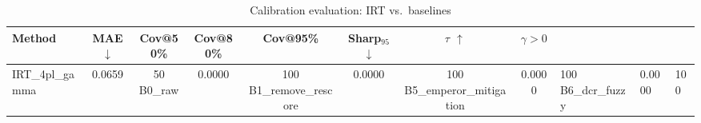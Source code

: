 \begin{table}[t]
\centering
\small
\caption{Calibration evaluation: IRT vs.\ baselines}
\label{tab:calibration-eval}
\begin{tabular}{lccccccc}
\toprule
Method & MAE $\downarrow$ & Cov@50\% & Cov@80\% & Cov@95\% & Sharp$_{95}$ $\downarrow$ & $\tau$ $\uparrow$ & $\gamma > 0$ \\
\midrule
IRT\_4pl\_gamma & 0.0659 & 50%
B0\_raw & 0.0000 & 100%
B1\_remove\_rescore & 0.0000 & 100%
B5\_emperor\_mitigation & 0.0000 & 100%
B6\_dcr\_fuzzy & 0.0000 & 100%
\bottomrule
\end{tabular}
\end{table}
